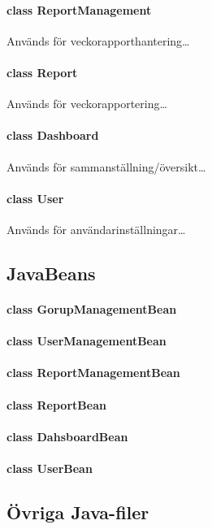 \documentclass[paper=a4, fontsize=11pt,twoside]{article}
\begin{document}
\paragraph{class ReportManagement} Används för veckorapporthantering… %
\paragraph{class Report} Används för veckorapportering… %
\paragraph{class Dashboard} Används för sammanställning/översikt… %
\paragraph{class User} Används för användarinställningar… %

\subsection{JavaBeans}
\paragraph{class GorupManagementBean} %
\paragraph{class UserManagementBean} %
\paragraph{class ReportManagementBean} %
\paragraph{class ReportBean} %
\paragraph{class DahsboardBean} %
\paragraph{class UserBean} %

\subsection{Övriga Java-filer} %
\end{document}
